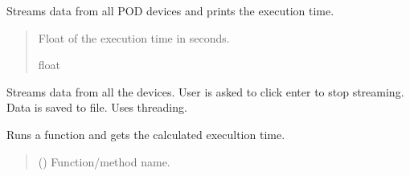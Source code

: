 \documentclass[letterpaper,10pt,english]{sphinxmanual}
\begin{document}
\begin{fulllineitems}
\begin{fulllineitems}
\end{fulllineitems}


\begin{fulllineitems}
\label{\detokenize{Setup_PodDevices:Setup_PodDevices.Setup_PodDevices._Stream}}
\pysigstartsignatures
{}
\pysigstopsignatures
\sphinxAtStartPar
Streams data from all POD devices and prints the execution time.
\begin{quote}\begin{description}
\sphinxAtStartPar
Float of the execution time in seconds.

\sphinxAtStartPar
float

\end{description}\end{quote}

\end{fulllineitems}


\begin{fulllineitems}
\label{\detokenize{Setup_PodDevices:Setup_PodDevices.Setup_PodDevices._StreamAllDevices}}
\pysigstartsignatures
{}
\pysigstopsignatures
\sphinxAtStartPar
Streams data from all the devices. User is asked to click enter to stop streaming.         Data is saved to file. Uses threading.

\end{fulllineitems}


\begin{fulllineitems}
\label{\detokenize{Setup_PodDevices:Setup_PodDevices.Setup_PodDevices._TimeFunc}}
\pysigstartsignatures
{}
\pysigstopsignatures
\sphinxAtStartPar
Runs a function and gets the calculated execultion time.
\begin{quote}\begin{description}
\sphinxAtStartPar
{} () \textendash{} Function/method name.


\end{description}
\end{quote}
\end{fulllineitems}
\end{fulllineitems}
\end{document}
